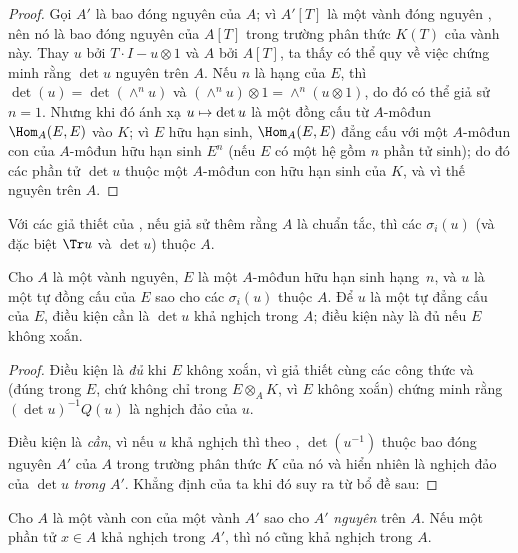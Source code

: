 \documentclass[oneside,10pt]{amsart}
\makeatletter
\newcommand{\ega@arrow}[2]{\mathchoice{#1}{#2}{#2}{#2}}
\let\ega@shortmapsto\mapsto
\renewcommand{\mapsto}{\ega@arrow{\longmapsto}{\ega@shortmapsto}}
\newcommand{\oldpage}[2][]{\marginnote{\normalfont\footnotesize\textbf{#1}~|~#2}\ignorespaces}
\let\EGAOriginalLabel\label
\renewcommand{\label}[1]{\phantomsection\EGAOriginalLabel{#1}}
\makeatother
\begin{document}
\begin{proof}
Gọi $A'$ là bao đóng nguyên của $A$;
vì $A'[T]$ là một vành đóng nguyên \cite[p.~99]{II-24}, nên nó là bao đóng nguyên của $A[T]$ trong trường phân thức $K(T)$ của vành này.
Thay $u$ bởi $T\cdot I-u\otimes1$ và $A$ bởi $A[T]$, ta thấy có thể quy về việc chứng minh rằng $\det u$ nguyên trên $A$.
Nếu $n$ là hạng của $E$, thì $\det(u)=\det(\wedge^n u)$ và $(\wedge^n u)\otimes1=\wedge^n(u\otimes1)$, do đó có thể giả sử $n=1$.
Nhưng khi đó ánh xạ $u\mapsto\det u$ là một đồng cấu từ $A$-môđun $\Hom_A(E,E)$ vào $K$;
vì $E$ hữu hạn sinh, $\Hom_A(E,E)$ đẳng cấu với một $A$-môđun con của $A$-môđun hữu hạn sinh $E^n$ (nếu $E$ có một hệ gồm $n$ phần tử sinh); do đó các phần tử $\det u$ thuộc một $A$-môđun con hữu hạn sinh của $K$, và vì thế nguyên trên $A$.
\end{proof}
\oldpage[II]{122}
\begin{corollary}[6.4.4]
\label{II.6.4.4}
Với các giả thiết của , nếu giả sử thêm rằng $A$ là chuẩn tắc, thì các $\sigma_i(u)$ (và đặc biệt $\Tr u$ và $\det u$) thuộc $A$.
\end{corollary}

\begin{proposition}[6.4.5]
\label{II.6.4.5}
Cho $A$ là một vành nguyên, $E$ là một $A$-môđun hữu hạn sinh hạng~$n$, và $u$ là một tự đồng cấu của $E$ sao cho các $\sigma_i(u)$ thuộc $A$.
Để $u$ là một tự đẳng cấu của $E$, điều kiện cần là $\det u$ khả nghịch trong $A$;
điều kiện này là đủ nếu $E$ không xoắn.
\end{proposition}

\begin{proof}
Điều kiện là \emph{đủ} khi $E$ không xoắn, vì giả thiết cùng các công thức  và  (đúng trong $E$, chứ không chỉ trong $E\otimes_A K$, vì $E$ không xoắn) chứng minh rằng $(\det u)^{-1}Q(u)$ là nghịch đảo của $u$.

Điều kiện là \emph{cần}, vì nếu $u$ khả nghịch thì theo , $\det(u^{-1})$ thuộc bao đóng nguyên $A'$ của $A$ trong trường phân thức $K$ của nó và hiển nhiên là nghịch đảo của $\det u$ \emph{trong $A'$}.
Khẳng định của ta khi đó suy ra từ bổ đề sau:
\end{proof}

\begin{lemma}[6.4.5.1]
\label{II.6.4.5.1}
Cho $A$ là một vành con của một vành $A'$ sao cho $A'$ \emph{nguyên} trên $A$.
Nếu một phần tử $x\in A$ khả nghịch trong $A'$, thì nó cũng khả nghịch trong $A$.
\end{lemma}
\end{document}
